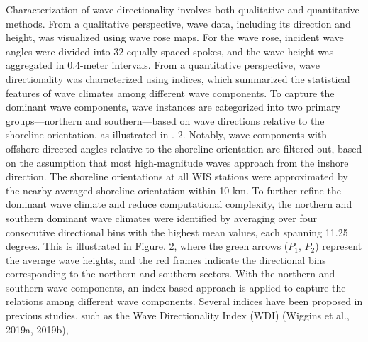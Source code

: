 Characterization of wave directionality involves both qualitative and quantitative methods. From a qualitative perspective, wave data, including its direction and height, was visualized using wave rose maps. For the wave rose, incident wave angles were divided into 32 equally spaced spokes, and the wave height was aggregated in 0.4-meter intervals. From a quantitative perspective, wave directionality was characterized using indices, which summarized the statistical features of wave climates among different wave components. To capture the dominant wave components, wave instances are categorized into two primary groups—northern and southern—based on wave directions relative to the shoreline orientation, as illustrated in . 2. Notably, wave components with offshore-directed angles relative to the shoreline orientation are filtered out, based on the assumption that most high-magnitude waves approach from the inshore direction. The shoreline orientations at all WIS stations were approximated by the nearby averaged shoreline orientation within 10 km. To further refine the dominant wave climate and reduce computational complexity, the northern and southern dominant wave climates were identified by averaging over four consecutive directional bins with the highest mean values, each spanning 11.25 degrees. This is illustrated in Figure. 2, where the green arrows ($P_1$, $P_2$) represent the average wave heights, and the red frames indicate the directional bins corresponding to the northern and southern sectors. With the northern and southern wave components, an index-based approach is applied to capture the relations among different wave components. Several indices have been proposed in previous studies, such as the Wave Directionality Index (WDI) (Wiggins et al., 2019a, 2019b),

